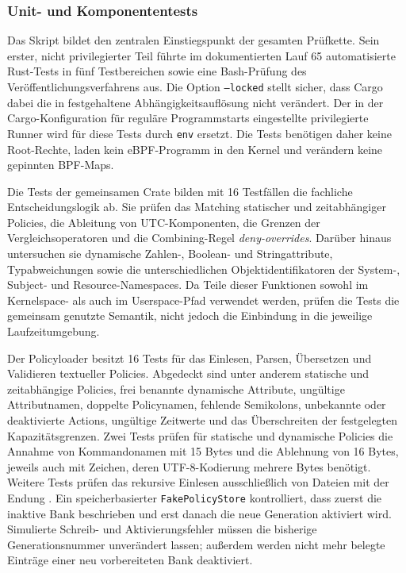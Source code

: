 \subsubsection{Unit- und Komponententests}

Das Skript  bildet den zentralen Einstiegspunkt der gesamten Prüfkette. Sein erster,
nicht privilegierter Teil führte im dokumentierten Lauf 65 automatisierte Rust-Tests in fünf Testbereichen sowie eine Bash-Prüfung des Veröffentlichungsverfahrens aus. Die Option
\texttt{--locked} stellt sicher, dass Cargo dabei die
in  festgehaltene Abhängigkeitsauflösung nicht verändert. Der in der
Cargo-Konfiguration für reguläre Programmstarts eingestellte privilegierte Runner wird für diese
Tests durch \texttt{env} ersetzt. Die Tests benötigen daher keine Root-Rechte, laden kein
eBPF-Programm in den Kernel und verändern keine gepinnten BPF-Maps.

Die Tests der gemeinsamen Crate  bilden mit 16 Testfällen die fachliche
Entscheidungslogik ab. Sie prüfen das Matching statischer und zeitabhängiger Policies, die
Ableitung von UTC-Komponenten, die Grenzen der Vergleichsoperatoren und die Combining-Regel
\emph{deny-overrides}. Darüber hinaus untersuchen sie dynamische Zahlen-, Boolean- und
Stringattribute, Typabweichungen sowie die unterschiedlichen Objektidentifikatoren der System-,
Subject- und Resource-Namespaces. Da Teile dieser Funktionen sowohl im Kernelspace- als auch im
Userspace-Pfad verwendet werden, prüfen die Tests die gemeinsam genutzte Semantik, nicht jedoch
die Einbindung in die jeweilige Laufzeitumgebung.

Der Policyloader besitzt 16 Tests für das Einlesen, Parsen, Übersetzen und Validieren textueller
Policies. Abgedeckt sind unter anderem statische und zeitabhängige Policies, frei benannte
dynamische Attribute, ungültige Attributnamen, doppelte Policynamen, fehlende Semikolons,
unbekannte oder deaktivierte Actions, ungültige Zeitwerte und das Überschreiten der festgelegten
Kapazitätsgrenzen. Zwei Tests prüfen für statische und dynamische Policies die Annahme von
Kommandonamen mit 15 Bytes und die Ablehnung von 16 Bytes, jeweils auch mit Zeichen, deren
UTF-8-Kodierung mehrere Bytes benötigt. Weitere Tests prüfen das rekursive Einlesen ausschließlich von Dateien mit der
Endung . Ein speicherbasierter \texttt{FakePolicyStore} kontrolliert, dass zuerst
die inaktive Bank beschrieben und erst danach die neue Generation aktiviert wird. Simulierte
Schreib- und Aktivierungsfehler müssen die bisherige Generationsnummer unverändert lassen; außerdem
werden nicht mehr belegte Einträge einer neu vorbereiteten Bank deaktiviert.

